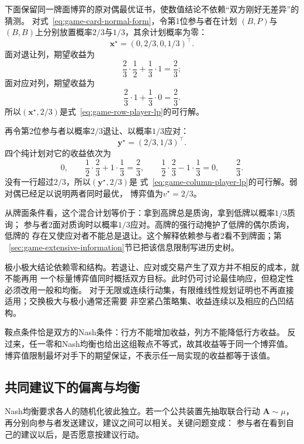 下面保留同一牌面博弈的原对偶最优证书，使数值结论不依赖“双方刚好无差异”的猜测。
对式~\eqref{eq:game-card-normal-form}，令第1位参与者在计划
\((B,P)\)与\((B,B)\)上分别放置概率\(2/3\)与\(1/3\)，其余计划概率为零：
\[
  \bm{x}^\star
  =
  (0,2/3,0,1/3)^{\top}.
\]
面对退让列，期望收益为
\[
  \frac23\cdot\frac12+\frac13\cdot1
  =
  \frac23;
\]
面对应对列，期望收益为
\[
  \frac23\cdot1+\frac13\cdot0
  =
  \frac23.
\]
所以\((\bm{x}^\star,2/3)\)是式~\eqref{eq:game-row-player-lp}的可行解。

再令第2位参与者以概率\(2/3\)退让、以概率\(1/3\)应对：
\[
  \bm{y}^\star=(2/3,1/3)^{\top}.
\]
四个纯计划对它的收益依次为
\[
  0,\qquad
  \frac12\cdot\frac23+1\cdot\frac13=\frac23,\qquad
  \frac12\cdot\frac23-1\cdot\frac13=0,\qquad
  \frac23.
\]
没有一行超过\(2/3\)，所以\((\bm{y}^\star,2/3)\)是
式~\eqref{eq:game-column-player-lp}的可行解。弱对偶已经足以说明两者同时最优，
博弈值为\(v^\star=2/3\)。

从牌面条件看，这个混合计划等价于：拿到高牌总是质询，拿到低牌以概率\(1/3\)质询；
参与者2面对质询时以概率\(1/3\)应对。高牌的强行动掩护了低牌的偶尔质询，低牌的
存在又使应对者不能总是退让。这个解释依赖参与者2看不到牌面；第
~\ref{sec:game-extensive-information}节已把该信息限制写进历史树。

极小极大结论依赖零和结构。若退让、应对或交易产生了双方并不相反的成本，就不能再用
一个标量博弈值同时概括双方目标。此时仍可讨论最佳响应，但稳定性必须改用一般和均衡。
对于无限或连续行动集，有限维线性规划证明也不再直接适用；交换极大与极小通常还需要
非空紧凸策略集、收益连续以及相应的凸凹结构。

鞍点条件恰是双方的Nash条件：行方不能增加收益，列方不能降低行方收益。
反过来，任一零和Nash均衡也给出这组鞍点不等式，故其收益等于同一个博弈值。
博弈值限制最坏对手下的期望保证，不表示任一局实现的收益都等于该值。

\subsection{共同建议下的偏离与均衡}
\label{sec:game-correlated-deviations}

Nash均衡要求各人的随机化彼此独立。若一个公共装置先抽取联合行动
\(\bm{A}\sim\mu\)，再分别向参与者发送建议，建议之间可以相关。关键问题变成：
参与者在看到自己的建议以后，是否愿意按建议行动。

